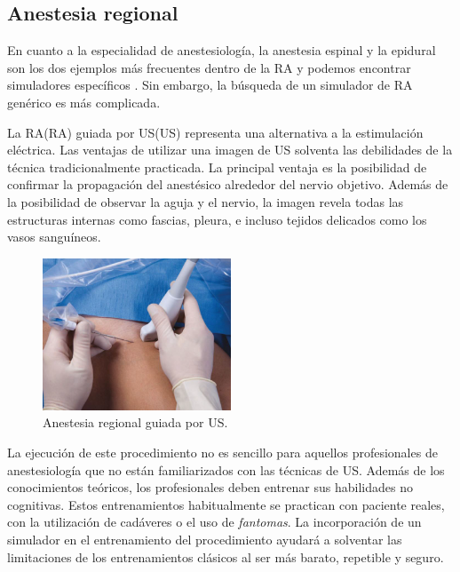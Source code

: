 \subsection{Anestesia regional}
\label{art:rasimas}

En cuanto a la especialidad de anestesiología, la anestesia espinal y la epidural son los dos ejemplos más frecuentes dentro de la \ac{RA} y podemos encontrar simuladores específicos \cite{broom2018evaluation}. Sin embargo, la búsqueda de un simulador de \ac{RA} genérico es más complicada.


La \acl{RA}(\acs{RA}) guiada por \acl{US}(\acs{US}) representa una alternativa a la estimulación eléctrica. Las ventajas de utilizar una imagen de \ac{US} solventa las debilidades de la técnica tradicionalmente practicada. La principal ventaja es la posibilidad de confirmar la propagación del anestésico alrededor del nervio objetivo. Además de la posibilidad de observar la aguja y el nervio, la imagen revela todas las estructuras internas como fascias, pleura, e incluso tejidos delicados como los vasos sanguíneos. 

\begin{figure}[h]
   \centering
    \includegraphics[width=0.5\textwidth]{IMG/RAUS.png}
    \caption{ Anestesia regional guiada por \acl{US}.}
   \label{fig:raus}
\end{figure}

La ejecución de este procedimiento no es sencillo para aquellos profesionales de anestesiología que no están familiarizados con las técnicas de \ac{US}. Además de los conocimientos teóricos, los profesionales deben entrenar sus habilidades no cognitivas. Estos entrenamientos habitualmente se practican con paciente reales, con la utilización de cadáveres\cite{Tsui2007} o el uso de \emph{fantomas}\cite{phantomra}. La incorporación de un simulador en el entrenamiento del procedimiento ayudará a solventar las limitaciones de los entrenamientos clásicos al ser más barato, repetible y seguro.


